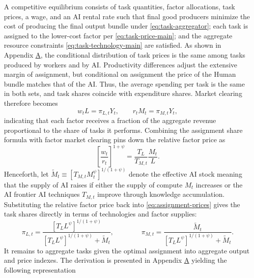 \documentclass[11pt]{article}
\begin{document}
A competitive equilibrium consists of task quantities, factor allocations,
task prices, a wage, and an AI rental rate such that final good producers
minimize the cost of producing the final output bundle under \eqref{eq:task-aggregator};
each task is assigned to the lower-cost factor per \eqref{eq:task-price-main};
and the aggregate resource constraints \eqref{eq:task-technology-main}
are satisfied. As shown in Appendix \href{https://ahmadlp.github.io/Lashkaripour_AI_Displacement_Online_Appendix.pdf\#page=1}{A},
the conditional distribution of task prices is the same among tasks
produced by workers and by AI. Productivity differences adjust the
extensive margin of assignment, but conditional on assignment the
price of the Human bundle matches that of the AI. Thus, the average
spending per task is the same in both sets, and task shares coincide
with expenditure shares. Market clearing therefore becomes
\begin{equation}
w_{t}L=\pi_{L,t}Y_{t},\qquad r_{t}M_{t}=\pi_{M,t}Y_{t},\label{eq:factor-clearing-main}
\end{equation}
indicating that each factor receives a fraction of the aggregate revenue
proportional to the share of tasks it performs. Combining the assignment
share formula with factor market clearing pins down the relative factor
price as
\begin{equation}
\left[\frac{w_{t}}{r_{t}}\right]^{1+\psi}=\frac{T_{L}}{T_{M,t}}\frac{M_{t}}{L}.\label{eq:relative-factor-price-main}
\end{equation}
Henceforth, let $\widetilde{M}_{t}\equiv[T_{M,t}M^{\psi}_{t}]^{1/(1+\psi)}$
denote the effective AI stock meaning that the supply of AI raises
if either the supply of compute $M_{t}$ increases or the AI frontier
AI techniques $T_{M,t}$ improve through knowledge accumulation. Substituting
the relative factor price back into \eqref{eq:assignment-prices}
gives the task shares directly in terms of technologies and factor
supplies:
\begin{equation}
\pi_{L,t}=\frac{[T_{L}L^{\psi}]^{1/(1+\psi)}}{[T_{L}L^{\psi}]^{1/(1+\psi)}+\widetilde{M}_{t}},\qquad\qquad\pi_{M,t}=\frac{\widetilde{M}_{t}}{[T_{L}L^{\psi}]^{1/(1+\psi)}+\widetilde{M}_{t}}.\label{eq:static-shares}

\end{equation}
It remains to aggregate tasks given the optimal assignment into aggregate
output and price indexes. The derivation is presented in Appendix
\href{https://ahmadlp.github.io/Lashkaripour_AI_Displacement_Online_Appendix.pdf\#page=1}{A} yielding the following representation
\end{document}
